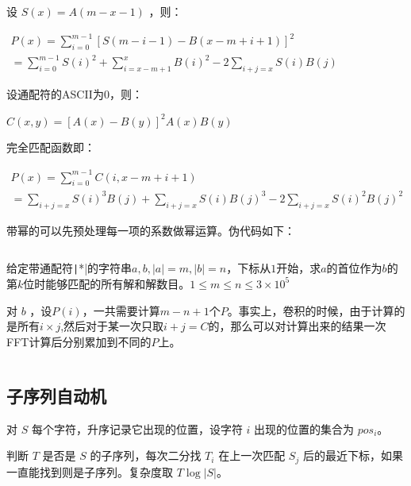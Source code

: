 \documentclass[twocolumn,10pt]{ctexart}
\begin{document}
设 $S(x)=A(m-x-1)$ ，则：

\begin{adjustbox}{max width=\linewidth,center}
$\begin{gathered}
P(x)=\sum_{i=0}^{m-1}[S(m-i-1)-B(x-m+i+1)]^2\\
=\sum_{i=0}^{m-1}S(i)^2+\sum_{i=x-m+1}^xB(i)^2-2\sum_{i+j=x}S(i)B(j)
\end{gathered}$
\end{adjustbox}

设通配符的ASCII为$0$，则：

\begin{adjustbox}{max width=\linewidth,center}
$C(x,y)=[A(x)-B(y)]^2A(x)B(y)$
\end{adjustbox}

完全匹配函数即：

\begin{adjustbox}{max width=\linewidth,center}
$\begin{gathered}
P(x)=\sum_{i=0}^{m-1}C(i,x-m+i+1)\\
=\sum_{i+j=x}S(i)^3B(j)+\sum_{i+j=x}S(i)B(j)^3-2\sum_{i+j=x}S(i)^2B(j)^2
\end{gathered}$
\end{adjustbox}

带幂的可以先预处理每一项的系数做幂运算。伪代码如下：

\inputminted{cpp}{code/ext_062.cpp}

\begin{notebox}
给定带通配符\texttt|*|的字符串$a,b,|a|=m,|b|=n$，下标从$1$开始，求$a$的首位作为$b$的第$k$位时能够匹配的所有解和解数目。$1\le m\le n\le3\times10^5$
\end{notebox}

对 $b$ ，设$P(i)$，一共需要计算$m-n+1$个$P$。事实上，卷积的时候，由于计算的是所有$i\times j$,然后对于某一次只取$i+j=C$的，那么可以对计算出来的结果一次FFT计算后分别累加到不同的$P$上。

\inputminted{cpp}{code/string_fft.cpp}

\subsection{子序列自动机}

对 $S$ 每个字符，升序记录它出现的位置，设字符 $i$ 出现的位置的集合为 $pos_i$。

判断 $T$ 是否是 $S$ 的子序列，每次二分找 $T_i$ 在上一次匹配 $S_j$ 后的最近下标，如果一直能找到则是子序列。复杂度取 $T\log |S|$。
\end{document}
